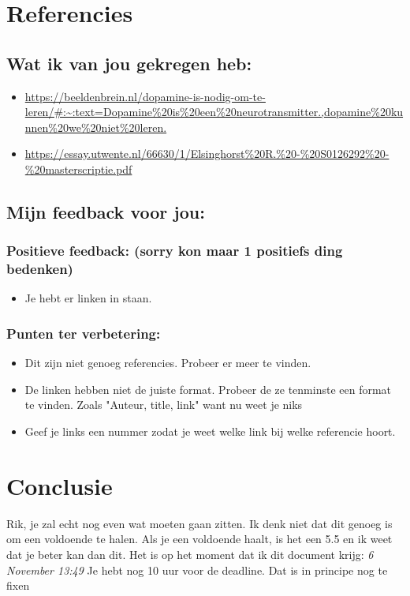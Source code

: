 \documentclass{article}
\begin{document}
    \newpage

    \section{Referencies}
        \subsection{Wat ik van jou gekregen heb:}
            {\itshape      
                \begin{itemize}
                    \item \url{https://beeldenbrein.nl/dopamine-is-nodig-om-te-leren/#:~:text=Dopamine%20is%20een%20neurotransmitter.,dopamine%20kunnen%20we%20niet%20leren.}
                    \item \url{https://essay.utwente.nl/66630/1/Elsinghorst%20R.%20-%20S0126292%20-%20masterscriptie.pdf }
                \end{itemize}
            }

        \bigskip

        \subsection{Mijn feedback voor jou:}
            \subsubsection{Positieve feedback: (sorry kon maar 1 positiefs ding bedenken)}
                \begin{itemize}
                \item Je hebt er linken in staan.
            \end{itemize}
            \subsubsection{Punten ter verbetering:}
            \begin{itemize}
                \item Dit zijn niet genoeg referencies. Probeer er meer te vinden.
                \item De linken hebben niet de juiste format. Probeer de ze tenminste een format te vinden. Zoals "Auteur, title, link" want nu weet je niks
                \item Geef je links een nummer zodat je weet welke link bij welke referencie hoort.
            \end{itemize}

    \newpage

    \section{Conclusie}
        Rik, je zal echt nog even wat moeten gaan zitten. Ik denk niet dat dit genoeg is om een voldoende te halen. Als je een voldoende haalt, is het een 5.5 en ik weet dat je beter kan dan dit. Het is op het moment dat ik dit document krijg: \textit{6 November 13:49} Je hebt nog 10 uur voor de deadline. Dat is in principe nog te fixen
                
\end{document}
